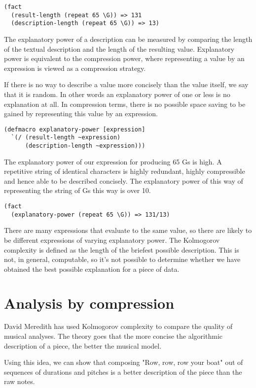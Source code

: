 \documentclass[numbers]{sigplanconf}
\begin{document}
\begin{verbatim}
(fact
  (result-length (repeat 65 \G)) => 131
  (description-length (repeat 65 \G)) => 13)
\end{verbatim}

The explanatory power of a description can be measured by comparing the length of the textual description and the length
of the resulting value. Explanatory power is equivalent to the compression power, where representing a value by an
expression is viewed as a compression strategy.

If there is no way to describe a value more concisely than the value itself, we say that it is random. In other words an
explanatory power of one or less is no explanation at all. In compression terms, there is no possible space saving
to be gained by representing this value by an expression.

\begin{verbatim}
(defmacro explanatory-power [expression]
  `(/ (result-length ~expression)
      (description-length ~expression)))
\end{verbatim}

The explanatory power of our expression for producing 65 Gs is high. A repetitive string of identical characters is
highly redundant, highly compressible and hence able to be described concisely. The explanatory power of this way of
representing the string of Gs this way is over 10.

\begin{verbatim}
(fact
  (explanatory-power (repeat 65 \G)) => 131/13)
\end{verbatim}

There are many expressions that evaluate to the same value, so there are likely to be different expressions of varying
explanatory power. The Kolmogorov complexity is defined as the length of the briefest possible description. This is not,
in general, computable, so it's not possible to determine whether we have obtained the best possible explanation for a
piece of data.

\section{Analysis by compression}

David Meredith has used Kolmogorov complexity to compare the quality of musical analyses. The theory goes that the
more concise the algorithmic description of a piece, the better the musical model.

Using this idea, we can show that composing "Row, row, row your boat" out of sequences of durations and pitches
is a better description of the piece than the raw notes.
\end{document}
